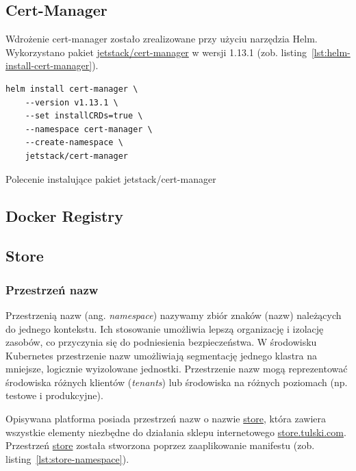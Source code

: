 \subsection{Cert-Manager}\label{subsec:cert-manager-impl}

Wdrożenie cert-manager zostało zrealizowane przy użyciu narzędzia Helm.
Wykorzystano pakiet \url{jetstack/cert-manager} w wersji 1.13.1 (zob. listing~\ref{lst:helm-install-cert-manager}).

\begin{listing}[H]
    \begin{verbatim}
helm install cert-manager \
    --version v1.13.1 \
    --set installCRDs=true \
    --namespace cert-manager \
    --create-namespace \
    jetstack/cert-manager
    \end{verbatim}
    \caption{Polecenie instalujące pakiet jetstack/cert-manager}
    \label{lst:helm-install-cert-manager}
\end{listing}

\subsection{Docker Registry}\label{subsec:docker-registry}

\todo{Docker Registry}

\subsection{Store}\label{subsec:store}

\subsubsection{Przestrzeń nazw}

Przestrzenią nazw (ang. \emph{namespace}) nazywamy zbiór znaków (nazw) należących do jednego kontekstu.
Ich stosowanie umożliwia lepszą organizację i izolację zasobów, co przyczynia się do podniesienia bezpieczeństwa.
W środowisku Kubernetes przestrzenie nazw umożliwiają segmentację jednego klastra na mniejsze, logicznie wyizolowane jednostki.
Przestrzenie nazw mogą reprezentować środowiska różnych klientów (\emph{tenants}) lub środowiska na różnych poziomach (np. testowe i produkcyjne).

Opisywana platforma posiada przestrzeń nazw o nazwie \url{store}, która zawiera wszystkie elementy niezbędne do działania sklepu internetowego \url{store.tulski.com}.
Przestrzeń \url{store} została stworzona poprzez zaaplikowanie manifestu (zob. listing~\ref{lst:store-namespace}).

